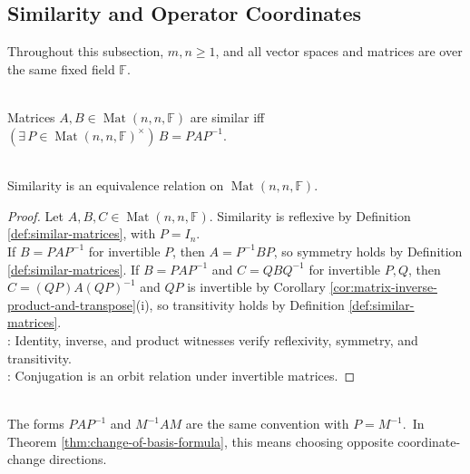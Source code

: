 \subsection{Similarity and Operator Coordinates}
Throughout this subsection, $m,n\geq1$, and all vector spaces and matrices are over the same fixed field $\mathbb{F}$.

\begin{definition} \label{def:similar-matrices} \\
Matrices $A,B\in\operatorname{Mat}(n,n,\mathbb{F})$ are similar iff $(\exists\,P\in\operatorname{Mat}(n,n,\mathbb{F})^{\times})\,B=PAP^{-1}$.
\end{definition}

\begin{proposition} \label{prop:similarity-equivalence-relation} \\
Similarity is an equivalence relation on $\operatorname{Mat}(n,n,\mathbb{F})$.
\begin{proof}
Let $A,B,C\in\operatorname{Mat}(n,n,\mathbb{F})$. Similarity is reflexive by Definition \ref{def:similar-matrices}, with $P=I_n$.\\
If $B=PAP^{-1}$ for invertible $P$, then $A=P^{-1}BP$, so symmetry holds by Definition \ref{def:similar-matrices}. If $B=PAP^{-1}$ and $C=QBQ^{-1}$ for invertible $P,Q$, then $C=(QP)A(QP)^{-1}$ and $QP$ is invertible by Corollary \ref{cor:matrix-inverse-product-and-transpose}(i), so transitivity holds by Definition \ref{def:similar-matrices}.\\
: Identity, inverse, and product witnesses verify reflexivity, symmetry, and transitivity.\\
: Conjugation is an orbit relation under invertible matrices.
\end{proof}
\end{proposition}

\begin{remark} \label{rem:similarity-convention} \\
The forms $PAP^{-1}$ and $M^{-1}AM$ are the same convention with $P=M^{-1}$.\
In Theorem \ref{thm:change-of-basis-formula}, this means choosing opposite coordinate-change directions.
\end{remark}

\begin{illustrationfigure}[H]
  \centering
  
  \caption{One operator in two bases: $PA=BP$, so $B=PAP^{-1}$.}
  \label{fig:similarity-change-of-basis-bridge}
\end{illustrationfigure}

